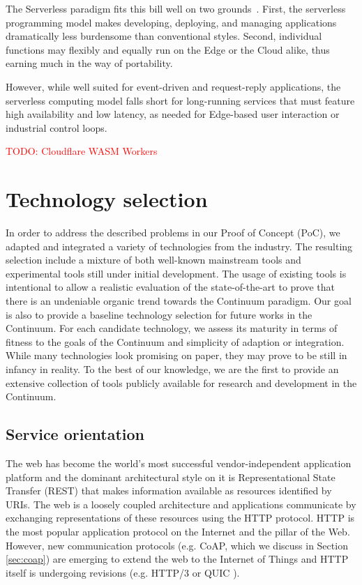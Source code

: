 The Serverless paradigm fits this bill well on two grounds~\cite{yi2017lavea}. First, the serverless programming model makes developing, deploying, and managing applications dramatically less burdensome than conventional styles.
Second, individual functions may flexibly and equally run on the Edge or the Cloud alike, thus earning much in the way of portability.

However, while well suited for event-driven and request-reply applications, the serverless computing model falls short for long-running services that must feature high availability and low latency, as needed for Edge-based user interaction or industrial control loops.

\textcolor{red}{TODO: Cloudflare WASM Workers}

\section{Technology selection}

In order to address the described problems in our Proof of Concept (PoC), we adapted and integrated a variety of technologies from the industry. The resulting selection include a mixture of both well-known mainstream tools and experimental tools still under initial development. The usage of existing tools is intentional to allow a realistic evaluation of the state-of-the-art to prove that there is an undeniable organic trend towards the Continuum paradigm. Our goal is also to provide a baseline technology selection for future works in the Continuum. For each candidate technology, we assess its maturity in terms of fitness to the goals of the Continuum and simplicity of adaption or integration. While many technologies look promising on paper, they may prove to be still in infancy in reality. To the best of our knowledge, we are the first to provide an extensive collection of tools publicly available for research and development in the Continuum.

\subsection{Service orientation}

The web has become the world's most successful vendor-independent application platform and the dominant architectural style on it is Representational State Transfer (REST) \cite{rest} that makes information available as resources identified by URIs. The web is a loosely coupled architecture and applications communicate by exchanging representations of these resources using the HTTP protocol. HTTP is the most popular application protocol on the Internet and the pillar of the Web. However, new communication protocols (e.g. CoAP, which we discuss in Section \ref{sec:coap}) are emerging to extend the web to the Internet of Things and HTTP itself is undergoing revisions (e.g. HTTP/3 or QUIC \cite{langley2017quic}).

